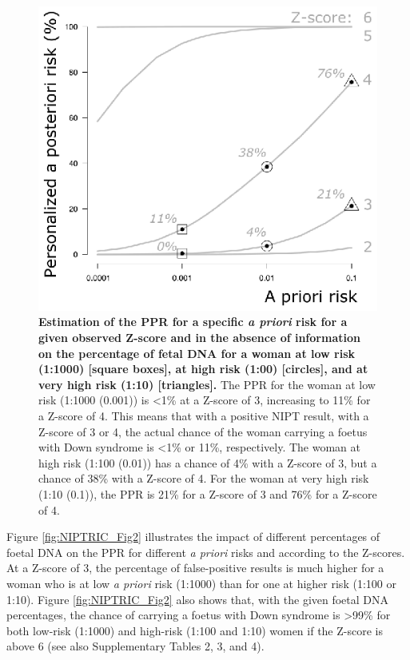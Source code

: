 \begin{figure}
	\includegraphics[width=1.0\linewidth]{img/NIPTRIC_Fig1}
	\caption[PPR at low and high risk]{\textbf{Estimation of the PPR for a specific \textsl{a priori} risk for a given observed Z-score and in the absence of information on the percentage of fetal DNA for a woman at low risk (1:1000) [square boxes], at high risk (1:00) [circles], and at very high risk (1:10) [triangles].} The PPR for the woman at low risk (1:1000 (0.001)) is \textless1\% at a Z-score of 3, increasing to 11\% for a Z-score of 4. This means that with a positive NIPT result, with a Z-score of 3 or 4, the actual chance of the woman carrying a foetus with Down syndrome is \textless1\% or 11\%, respectively. The woman at high risk (1:100 (0.01)) has a chance of 4\% with a Z-score of 3, but a chance of 38\% with a Z-score of 4. For the woman at very high risk (1:10 (0.1)), the PPR is 21\% for a Z-score of 3 and 76\% for a Z-score of 4.}
	\label{fig:NIPTRIC_Fig1}
\end{figure}

Figure \ref{fig:NIPTRIC_Fig2} illustrates the impact of different percentages of foetal DNA on the PPR for different \textsl{a priori} risks and according to the Z-scores. At a Z-score of 3, the percentage of false-positive results is much higher for a woman who is at low \textsl{a priori} risk (1:1000) than for one at higher risk (1:100 or 1:10). Figure \ref{fig:NIPTRIC_Fig2} also shows that, with the given foetal DNA percentages, the chance of carrying a foetus with Down syndrome is \textgreater99\% for both low-risk (1:1000) and high-risk (1:100 and 1:10) women if the Z-score is above 6 (see also Supplementary Tables 2, 3, and 4).

